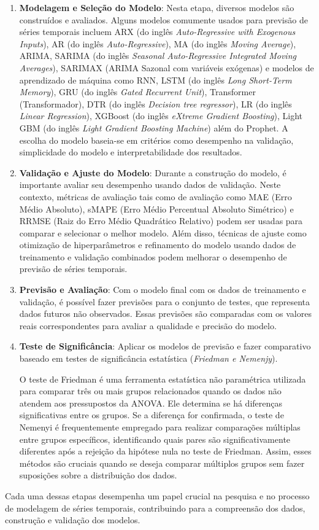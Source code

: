 \begin{enumerate}[start=1, label={\textbf{Etapa} \arabic*}]
	\item \label{etp:5} \textbf{Modelagem e Seleção do Modelo}: Nesta etapa, diversos modelos são construídos e avaliados. Alguns modelos comumente usados para previsão de séries temporais incluem ARX (do inglês \textit{Auto-Regressive with Exogenous Inputs}), AR (do inglês \textit{Auto-Regressive}), MA (do inglês \textit{Moving Average}), ARIMA, SARIMA (do inglês \textit{Seasonal Auto-Regressive Integrated Moving Averages}), SARIMAX (ARIMA Sazonal com variáveis exógenas) e modelos de aprendizado de máquina como RNN, LSTM (do inglês \textit{Long Short-Term Memory}), GRU (do inglês \textit{Gated Recurrent Unit}), Transformer (Transformador), DTR (do inglês \textit{Decision tree regressor}), LR (do inglês \textit{Linear Regression}), XGBoost (do inglês \textit{eXtreme Gradient Boosting}), Light GBM (do inglês \textit{Light Gradient Boosting Machine}) além do Prophet. A escolha do modelo baseia-se em critérios como desempenho na validação, simplicidade do modelo e interpretabilidade dos resultados.
	
	\item \label{etp:6} \textbf{Validação e Ajuste do Modelo}: Durante a construção do modelo, é importante avaliar seu desempenho usando dados de validação. Neste contexto, métricas de avaliação tais como de avaliação como MAE (Erro Médio Absoluto), sMAPE (Erro Médio Percentual Absoluto Simétrico) e RRMSE (Raiz do Erro Médio Quadrático Relativo) podem ser usadas para comparar e selecionar o melhor modelo. Além disso, técnicas de ajuste como otimização de hiperparâmetros e refinamento do modelo usando dados de treinamento e validação combinados podem melhorar o desempenho de previsão de séries temporais.
	
	\item \label{etp:7} \textbf{Previsão e Avaliação}: Com o modelo final com os dados de treinamento e validação, é possível fazer previsões para o conjunto de testes, que representa dados futuros não observados. Essas previsões são comparadas com os valores reais correspondentes para avaliar a qualidade e precisão do modelo.
	
	\item \label{etp:8} \textbf{Teste de Significância}: Aplicar os modelos de previsão e fazer comparativo baseado em testes de significância estatística (\textit{Friedman e Nemenjy}).
	
	O teste de Friedman é uma ferramenta estatística não paramétrica utilizada para comparar três ou mais grupos relacionados quando os dados não atendem aos pressupostos da ANOVA. Ele determina se há diferenças significativas entre os grupos. Se a diferença for confirmada, o teste de Nemenyi é frequentemente empregado para realizar comparações múltiplas entre grupos específicos, identificando quais pares são significativamente diferentes após a rejeição da hipótese nula no teste de Friedman. Assim, esses métodos são cruciais quando se deseja comparar múltiplos grupos sem fazer suposições sobre a distribuição dos dados.

	
\end{enumerate}

Cada uma dessas etapas desempenha um papel crucial na pesquisa e no processo de modelagem de séries temporais, contribuindo para a compreensão dos dados, construção e validação dos modelos.




    